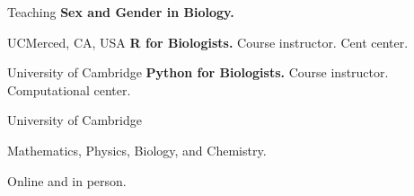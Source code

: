 \begin{rubric}{Teaching}
 \entry*[2023]%
	\textbf{Sex and Gender in Biology.} \par UCMerced, CA, USA
\entry*[2018-2020]%
	\textbf{R for Biologists.} Course instructor. Cent center. \par University of Cambridge
 \entry*[2018-2020]%
	\textbf{Python for Biologists.} Course instructor. Computational center. \par University of Cambridge


 \entry*[2014--2022]%
	Mathematics, Physics, Biology, and Chemistry. \par Online and in person.
%
\end{rubric}